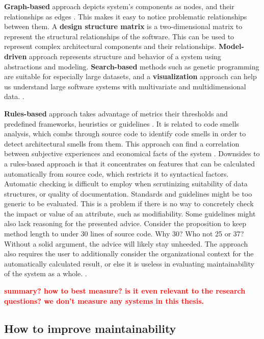 \documentclass[utf8,english]{gradu3}
\newcommand{\todo}[1]{\textbf{\textcolor{red}{#1}}}
\begin{document}
\textbf{Graph-based} approach depicts system's components as nodes, and their
relationships as edges \parencite{Mumtaz2021}. This makes it easy to notice
problematic relationships between them. A \textbf{design structure matrix} is a
two-dimensional matrix to represent the structural relationships of the
software. This can be used to represent complex architectural components and
their relationships. \textbf{Model-driven} approach represents structure and
behavior of a system using abstractions and modeling. \textbf{Search-based}
methods such as genetic programming are suitable for especially large datasets,
and a \textbf{visualization} approach can help us understand large software
systems with multivariate and multidimensional data.
\parencite[9-14]{Mumtaz2021}.

\textbf{Rules-based} approach takes advantage of metrics their thresholds and
predefined frameworks, heuristics or guidelines \parencite[8]{Mumtaz2021}. It is
related to code smells analysis, which combs through source code to identify
code smells in order to detect architectural smells from them. This approach can
find a correlation between subjective experiences and economical facts of the
system \parencite[22]{Broy2006}. Downsides to a rules-based approach is that it
concentrates on features that can be calculated automatically from source code,
which restricts it to syntactical factors. Automatic checking is difficult to
employ when scrutinizing suitability of data structures, or quality of
documentation. Standards and guidelines might be too generic to be evaluated.
This is a problem if there is no way to concretely check the impact or value of
an attribute, such as modifiability. Some guidelines might also lack reasoning
for the presented advice. Consider the proposition to keep method length to
under 30 lines of source code. Why 30? Who not 25 or 37? Without a solid
argument, the advice will likely stay unheeded. The approach also requires the
user to additionally consider the organizational context for the automatically
calculated result, or else it is useless in evaluating maintainability of the
system as a whole. \parencite[22]{Broy2006}.

\todo{summary? how to best measure? is it even relevant to the research questions?
  we don't measure any systems in this thesis.}

\subsection{How to improve maintainability}
\end{document}
